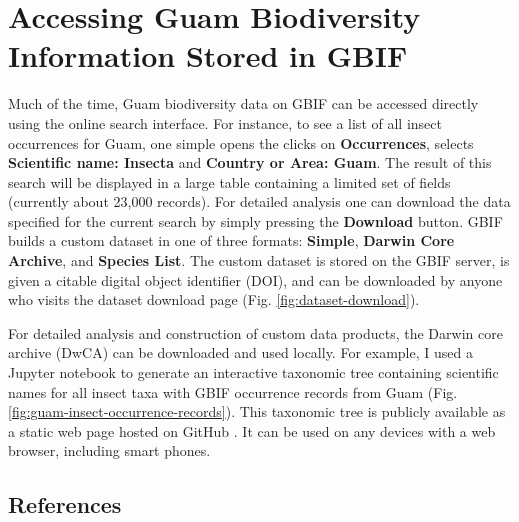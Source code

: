 \documentclass[12pt,letterpaper,english,bibliography=totocnumbered, abstract=on]{scrartcl}
\begin{document}
\pagebreak
\section{Accessing Guam Biodiversity Information Stored in GBIF}
\newrefsection[my.bib]

Much of the time, Guam biodiversity data on GBIF can be accessed directly using the online search interface. For instance, to see a list of all insect occurrences for Guam, one simple opens the clicks on \textbf{Occurrences}, selects \textbf{Scientific name: Insecta} and \textbf{Country or Area: Guam}. The result of this search will be displayed in a large table containing a limited set of fields (currently about 23,000 records). For detailed analysis one can download the data specified for the current search by simply pressing the \textbf{Download} button. GBIF builds a custom dataset in one of three formats: \textbf{Simple}, \textbf{Darwin Core Archive}, and \textbf{Species List}. The custom dataset is stored on the GBIF server, is given a citable digital object identifier (DOI), and can be downloaded by anyone who visits the dataset download page \cite{https://doi.org/10.15468/dl.yztrkr} (Fig. \ref{fig:dataset-download}).

For detailed analysis and construction of custom data products, the Darwin core archive (DwCA) can be downloaded and used locally. For example, I used a Jupyter notebook \cite{taxonview-ipynb} to generate an interactive taxonomic tree containing scientific names for all insect taxa with GBIF occurrence records from Guam (Fig. \ref{fig:guam-insect-occurrence-records}). This taxonomic tree is publicly available as a static web page hosted on GitHub \cite{taxonview-page}. It can be used on any devices with a web browser, including smart phones.


\subsection{References}
\printbibliography[heading=none]
\end{document}

